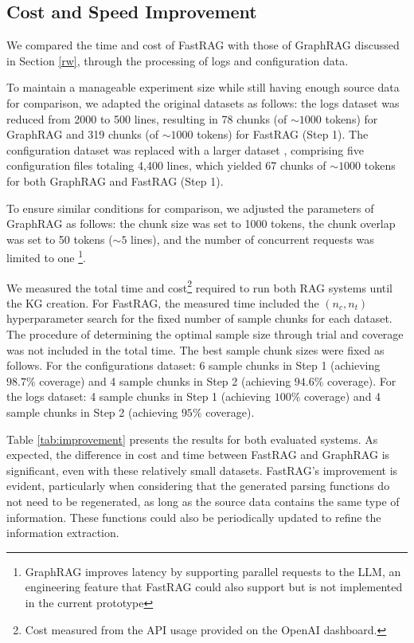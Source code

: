 \documentclass[conference]{IEEEtran}
\begin{document}
\subsection{Cost and Speed Improvement}
We compared the time and cost of FastRAG with those of GraphRAG discussed in Section \ref{rw}, through the processing of logs and configuration data.

To maintain a manageable experiment size while still having enough source data for comparison, we adapted the original datasets as follows: 
the logs dataset was reduced from 2000 to 500 lines, resulting in 78 chunks (of $\sim1000$ tokens) for GraphRAG and 319 chunks (of $\sim1000$ tokens) for FastRAG (Step 1). 
The configuration dataset was replaced with a larger dataset \cite{netplumber}, comprising five configuration files totaling 4,400 lines, which yielded 67 chunks of $\sim1000$ tokens for both GraphRAG and FastRAG (Step 1).

To ensure similar conditions for comparison, we adjusted the parameters of GraphRAG as follows: the chunk size was set to 1000 tokens, the chunk overlap was set to 50 tokens ($\sim5$ lines), and the number of concurrent requests was limited to one \footnote{GraphRAG improves latency by supporting parallel requests to the LLM, an engineering feature that FastRAG could also support but is not implemented in the current prototype}.

We measured the total time and cost\footnote{Cost measured from the API usage provided on the OpenAI dashboard.} required to run both RAG systems until the KG creation.
For FastRAG, the measured time included the $(n_c,n_t)$ hyperparameter search for the fixed number of sample chunks for each dataset. The procedure of determining the optimal sample size through trial and coverage was not included in the total time.
The best sample chunk sizes were fixed as follows. 
For the configurations dataset: 6 sample chunks in Step 1 (achieving $98.7\%$ coverage) and 4 sample chunks in Step 2 (achieving $94.6\%$ coverage). 
For the logs dataset: 4 sample chunks in Step 1 (achieving $100\%$ coverage) and 4 sample chunks in Step 2 (achieving $95\%$ coverage).

Table \ref{tab:improvement} presents the results for both evaluated systems. As expected, the difference in cost and time between FastRAG and GraphRAG is significant, even with these relatively small datasets. FastRAG's improvement is evident, particularly when considering that the generated parsing functions do not need to be regenerated, as long as the source data contains the same type of information. These functions could also be periodically updated to refine the information extraction.
\end{document}
